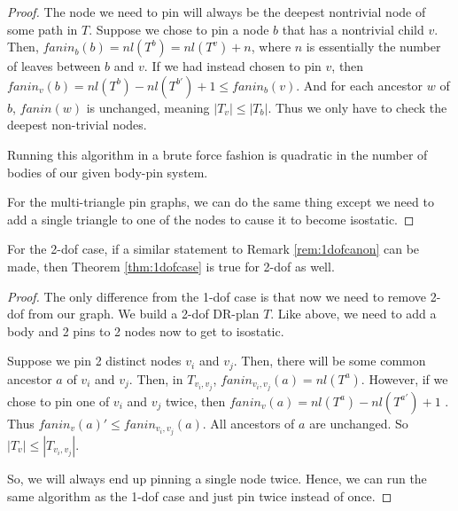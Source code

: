 \begin{proof}

    The node we need to pin will always be the deepest nontrivial node of some path in $T$. Suppose we chose to pin a node $b$ that has a nontrivial child $v$. Then, $fanin_b(b) = nl(T^b) = nl(T^v) + n$, where $n$ is essentially the number of leaves between $b$ and $v$. If we had instead chosen to pin $v$, then $fanin_v(b) = nl(T^b) - nl(T^{b'}) + 1 \leq fanin_b(v)$. And for each ancestor $w$ of $b$, $fanin(w)$ is unchanged, meaning $|T_v| \leq |T_b|$. Thus we only have to check the deepest non-trivial nodes.

    Running this algorithm in a brute force fashion is quadratic in the number of bodies of our given body-pin system.

    For the multi-triangle pin graphs, we can do the same thing except we need to add a single triangle to one of the nodes to cause it to become isostatic.
\end{proof}

\begin{observation}
    For the 2-dof case, if a similar statement to Remark \ref{rem:1dofcanon} can be made, then Theorem \ref{thm:1dofcase} is true for 2-dof as well.
\end{observation}

\begin{proof}
    The only difference from the 1-dof case is that now we need to remove 2-dof from our graph. We build a 2-dof DR-plan $T$. Like above, we need to add a body and 2 pins to 2 nodes now to get to isostatic.

    Suppose we pin 2 distinct nodes $v_i$ and $v_j$. Then, there will be some common ancestor $a$ of $v_i$ and $v_j$. Then, in $T_{v_i,v_j}$, $fanin_{v_i,v_j}(a) = nl(T^a)$. However, if we chose to pin one of $v_i$ and $v_j$ twice, then $fanin_v(a) = nl(T^a) - nl(T^{a'}) +1$ . Thus $fanin_v(a)' \leq fanin_{v_i,v_j}(a)$. All ancestors of $a$ are unchanged. So $|T_v| \leq |T_{v_i,v_j}|$.

    So, we will always end up pinning a single node twice. Hence, we can run the same algorithm as the 1-dof case and just pin twice instead of once.
\end{proof}

